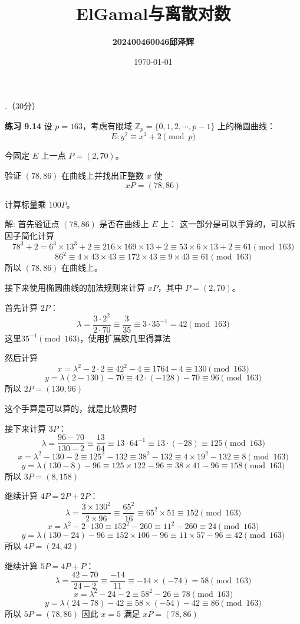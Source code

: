 \documentclass[12pt,a4paper]{article}
\title{
\textbf{\LARGE{ElGamal与离散对数}}\\[0.5em]
}
\author{\textbf{202400460046邱泽辉}}
\date{\today}
\begin{document}
.（30分）

\textbf{练习 9.14} 设 $p = 163$，考虑有限域 $\mathbb{Z}_p = \{0,1,2,\cdots,p-1\}$ 上的椭圆曲线：
\[
E: y^2 \equiv x^3 + 2 \pmod{p}
\]

今固定 $E$ 上一点 $P = (2,70)$。

验证 $(78,86)$ 在曲线上并找出正整数 $x$ 使
\[
xP = (78,86)
\]

计算标量乘 $100P$。

解:
首先验证点 $(78,86)$ 是否在曲线上 $E$ 上：
这一部分是可以手算的，可以拆因子简化计算
\[
78^3+2 = 6^3 \times 13^3 + 2 \equiv 216 \times 169 \times 13 + 2 \equiv 53 \times 6 \times 13 + 2 \equiv 61 \pmod{163}
\]
\[
86^2 \equiv 4 \times 43 \times 43 \equiv 172 \times 43 \equiv 9 \times 43 \equiv 61 \pmod{163}
\]
所以 $(78,86)$ 在曲线上。

接下来使用椭圆曲线的加法规则来计算 $xP$，其中 $P=(2,70)$。

首先计算 $2P$：
\[
\lambda = \frac{3 \cdot 2^2}{2 \cdot 70} \equiv \frac{3}{35} \equiv 3 \cdot 35^{-1} = 42 \pmod{163}
\]
这里$35^{-1} \pmod{163}$，使用扩展欧几里得算法

然后计算
\[
x = \lambda^2 - 2 \cdot 2 \equiv 42^2 - 4 \equiv 1764 - 4 \equiv 130 \pmod{163}
\]
\[
y = \lambda (2 - 130) - 70 \equiv 42 \cdot (-128) - 70 \equiv 96 \pmod{163}
\]
所以 $2P = (130, 96)$

这个手算是可以算的，就是比较费时

接下来计算 $3P$：
\[
\lambda = \frac{96 - 70}{130 - 2} \equiv \frac{13}{64} \equiv 13 \cdot 64^{-1} \equiv 13 \cdot (-28) \equiv 125 \pmod{163}
\]
\[
x = \lambda^2 - 130 - 2 \equiv 125^2 - 132 \equiv 38^2 -132 \equiv 4\times 19^2 -132 \equiv 8 \pmod{163}
\]
\[
y = \lambda (130 - 8) - 96 \equiv 125 \times 122 - 96 \equiv 38\times 41 - 96 \equiv 158 \pmod{163}
\]
所以 $3P = (8, 158)$

继续计算 $4P=2P+2P$：
\[
\lambda = \frac{3 \times 130^2}{2 \times 96} \equiv \frac{65^2}{16} \equiv 65^2 \times 51  \equiv 152 \pmod{163}
\]
\[
x = \lambda^2 - 2 \cdot 130 \equiv 152^2 - 260 \equiv 11^2 - 260 \equiv 24 \pmod{163}
\]
\[
y = \lambda (130 - 24) - 96 \equiv 152 \times 106 - 96 \equiv 11 \times 57 - 96 \equiv 42 \pmod{163}
\]
所以 $4P = (24, 42)$

继续计算 $5P=4P+P$：
\[
\lambda = \frac{42 - 70}{24 - 2} \equiv \frac{-14}{11} \equiv -14 \times (-74)  = 58 \pmod{163}
\]
\[
x = \lambda^2 - 24 - 2 \equiv 58^2 - 26 \equiv 78 \pmod{163}
\]
\[y = \lambda (24 - 78) - 42 \equiv 58 \times (-54) - 42 \equiv 86 \pmod{163}\]
所以 $5P = (78, 86)$
因此 $x=5$ 满足 $xP = (78, 86)$
\end{document}
